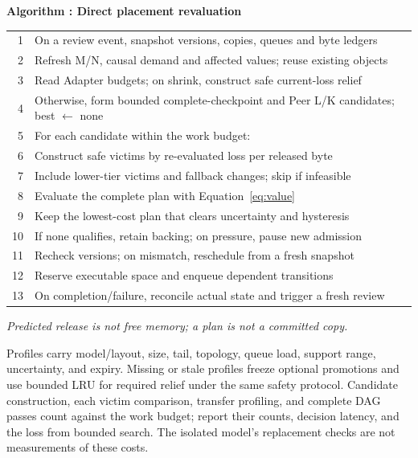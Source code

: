 \par\medskip\noindent\begin{minipage}{\columnwidth}
\raggedright
 \label{alg:placement}
 \textbf{Algorithm \thedesignalgorithm: Direct placement revaluation}
 \par\smallskip
 \begin{tabularx}{\columnwidth}{@{}r@{\quad}X@{}}
 \toprule
 1 & On a review event, snapshot versions, copies, queues and byte ledgers \\
 2 & Refresh M/N, causal demand and affected values; reuse existing objects \\
 3 & Read Adapter budgets; on shrink, construct safe current-loss relief \\
 4 & Otherwise, form bounded complete-checkpoint and Peer L/K candidates; best $\leftarrow$ none \\
 5 & For each candidate within the work budget: \\
 6 & \quad Construct safe victims by re-evaluated loss per released byte \\
 7 & \quad Include lower-tier victims and fallback changes; skip if infeasible \\
 8 & \quad Evaluate the complete plan with Equation~\ref{eq:value} \\
 9 & \quad Keep the lowest-cost plan that clears uncertainty and hysteresis \\
 10 & If none qualifies, retain backing; on pressure, pause new admission \\
 11 & Recheck versions; on mismatch, reschedule from a fresh snapshot \\
 12 & Reserve executable space and enqueue dependent transitions \\
 13 & On completion/failure, reconcile actual state and trigger a fresh review \\
 \bottomrule
 \end{tabularx}
 \par\smallskip\noindent\textit{Predicted release is not free memory; a plan is not a committed copy.}
 \end{minipage}\par\medskip

Profiles carry model/layout, size, tail, topology, queue load, support
range, uncertainty, and expiry. Missing or stale profiles freeze optional
promotions and use bounded LRU for required relief under the same safety
protocol. Candidate construction, each victim comparison, transfer
profiling, and complete DAG passes count against the work budget; report
their counts, decision latency, and the loss from bounded search. The
isolated model's replacement checks are not measurements of these costs.

